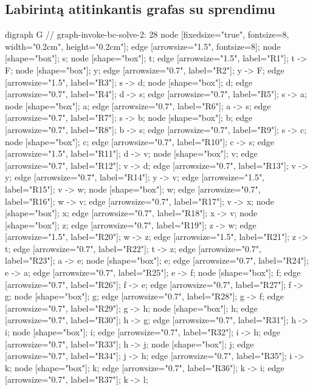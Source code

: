 \subsection{Labirintą atitinkantis grafas su sprendimu}

\begin{pythonaienv}
digraph G { // graph-invoke-bc-solve-2: 28 
node [fixedsize="true", fontsize=8, width="0.2cm", height="0.2cm"];
edge [arrowsize="1.5", fontsize=8];
node [shape="box"]; s; 
node [shape="box"]; t; 
edge [arrowsize="1.5", label="R1"]; t -> F; 
node [shape="box"]; y; 
edge [arrowsize="0.7", label="R2"]; y -> F; 
edge [arrowsize="1.5", label="R3"]; s -> d; 
node [shape="box"]; d; 
edge [arrowsize="0.7", label="R4"]; d -> s; 
edge [arrowsize="0.7", label="R5"]; s -> a; 
node [shape="box"]; a; 
edge [arrowsize="0.7", label="R6"]; a -> s; 
edge [arrowsize="0.7", label="R7"]; s -> b; 
node [shape="box"]; b; 
edge [arrowsize="0.7", label="R8"]; b -> s; 
edge [arrowsize="0.7", label="R9"]; s -> c; 
node [shape="box"]; c; 
edge [arrowsize="0.7", label="R10"]; c -> s; 
edge [arrowsize="1.5", label="R11"]; d -> v; 
node [shape="box"]; v; 
edge [arrowsize="0.7", label="R12"]; v -> d; 
edge [arrowsize="0.7", label="R13"]; v -> y; 
edge [arrowsize="0.7", label="R14"]; y -> v; 
edge [arrowsize="1.5", label="R15"]; v -> w; 
node [shape="box"]; w; 
edge [arrowsize="0.7", label="R16"]; w -> v; 
edge [arrowsize="0.7", label="R17"]; v -> x; 
node [shape="box"]; x; 
edge [arrowsize="0.7", label="R18"]; x -> v; 
node [shape="box"]; z; 
edge [arrowsize="0.7", label="R19"]; z -> w; 
edge [arrowsize="1.5", label="R20"]; w -> z; 
edge [arrowsize="1.5", label="R21"]; z -> t; 
edge [arrowsize="0.7", label="R22"]; t -> z; 
edge [arrowsize="0.7", label="R23"]; a -> e; 
node [shape="box"]; e; 
edge [arrowsize="0.7", label="R24"]; e -> a; 
edge [arrowsize="0.7", label="R25"]; e -> f; 
node [shape="box"]; f; 
edge [arrowsize="0.7", label="R26"]; f -> e; 
edge [arrowsize="0.7", label="R27"]; f -> g; 
node [shape="box"]; g; 
edge [arrowsize="0.7", label="R28"]; g -> f; 
edge [arrowsize="0.7", label="R29"]; g -> h; 
node [shape="box"]; h; 
edge [arrowsize="0.7", label="R30"]; h -> g; 
edge [arrowsize="0.7", label="R31"]; h -> i; 
node [shape="box"]; i; 
edge [arrowsize="0.7", label="R32"]; i -> h; 
edge [arrowsize="0.7", label="R33"]; h -> j; 
node [shape="box"]; j; 
edge [arrowsize="0.7", label="R34"]; j -> h; 
edge [arrowsize="0.7", label="R35"]; i -> k; 
node [shape="box"]; k; 
edge [arrowsize="0.7", label="R36"]; k -> i; 
edge [arrowsize="0.7", label="R37"]; k -> l; 
}
\end{pythonaienv}
